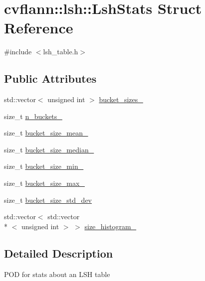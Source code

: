\hypertarget{structcvflann_1_1lsh_1_1LshStats}{\section{cvflann\-:\-:lsh\-:\-:Lsh\-Stats Struct Reference}
\label{structcvflann_1_1lsh_1_1LshStats}
}


{\ttfamily \#include $<$lsh\-\_\-table.\-h$>$}

\subsection*{Public Attributes}
\begin{DoxyCompactItemize}
\item 
std\-::vector$<$ unsigned int $>$ \hyperlink{structcvflann_1_1lsh_1_1LshStats_a1b5377341a9c08fb76658aace06c085d}{bucket\-\_\-sizes\-\_\-}
\item 
size\-\_\-t \hyperlink{structcvflann_1_1lsh_1_1LshStats_ac61b04700a3dea30d323959676749573}{n\-\_\-buckets\-\_\-}
\item 
size\-\_\-t \hyperlink{structcvflann_1_1lsh_1_1LshStats_ab13dd34955dd186016d44e981ef49e56}{bucket\-\_\-size\-\_\-mean\-\_\-}
\item 
size\-\_\-t \hyperlink{structcvflann_1_1lsh_1_1LshStats_a9dd5ebc487557c60719da44cb32e5e42}{bucket\-\_\-size\-\_\-median\-\_\-}
\item 
size\-\_\-t \hyperlink{structcvflann_1_1lsh_1_1LshStats_ab6da64928044451617f8300332745e25}{bucket\-\_\-size\-\_\-min\-\_\-}
\item 
size\-\_\-t \hyperlink{structcvflann_1_1lsh_1_1LshStats_a65eadc691e747d193ab360c70718e5ba}{bucket\-\_\-size\-\_\-max\-\_\-}
\item 
size\-\_\-t \hyperlink{structcvflann_1_1lsh_1_1LshStats_aafce95661b13b73242cd2b65130f83ec}{bucket\-\_\-size\-\_\-std\-\_\-dev}
\item 
std\-::vector$<$ std\-::vector\\*
$<$ unsigned int $>$ $>$ \hyperlink{structcvflann_1_1lsh_1_1LshStats_aeb9f127c44c04570068470403992305d}{size\-\_\-histogram\-\_\-}
\end{DoxyCompactItemize}


\subsection{Detailed Description}
P\-O\-D for stats about an L\-S\-H table 

